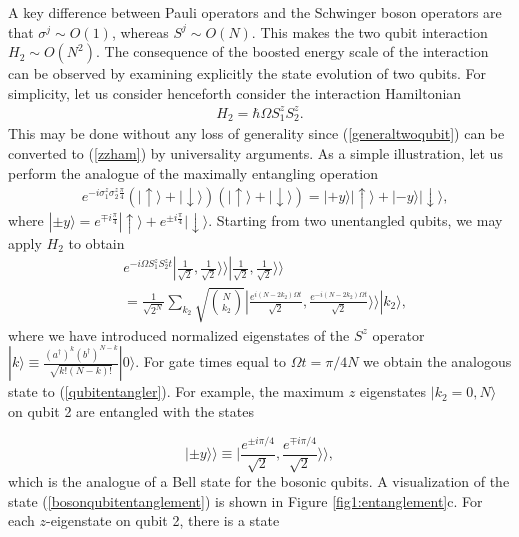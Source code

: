 \documentclass[
aps,%
12pt,%
final,%
notitlepage,%
oneside,%
onecolumn,%
nobibnotes,%
nofootinbib,%
superscriptaddress,%
noshowpacs,%
centertags]%
{revtex4}
\begin{document}
A key difference between Pauli operators and the Schwinger boson operators are that $ \sigma^j \sim O(1) $, whereas $ S^j \sim O(N) $.  This makes the two qubit interaction $ H_2 \sim O(N^2) $.  The consequence of the boosted energy scale of the interaction can be observed by examining explicitly the state evolution of two qubits. For simplicity, let us consider henceforth consider the interaction Hamiltonian 
%
\begin{align}
\label{zzham}
H_2 = \hbar \Omega S^z_1 S^z_2 .
\end{align}
%
This may be done without any loss of generality since (\ref{generaltwoqubit}) can be converted to (\ref{zzham}) by universality arguments. 
As a simple illustration, let us perform the analogue of the maximally entangling operation 
%
\begin{align}
& e^{-i  \sigma^z_1 \sigma^z_2 \frac{\pi}{4} } ( | \uparrow \rangle + | \downarrow \rangle ) ( | \uparrow \rangle + | \downarrow \rangle ) =  | + y \rangle | \uparrow \rangle  + | - y \rangle | \downarrow \rangle, \label{qubitentangler}
\end{align}
%
where $ | \pm y \rangle = e^{\mp i\frac{\pi}{4}} | \uparrow \rangle + e^{\pm i\frac{\pi}{4}} | \downarrow \rangle $. Starting from two unentangled qubits, we may apply $ H_2 $ to obtain
%
\begin{align}
& e^{-i \Omega S^z_1 S^z_2 t} | \frac{1}{\sqrt{2}}, \frac{1}{\sqrt{2}} \rangle \rangle | \frac{1}{\sqrt{2}}, \frac{1}{\sqrt{2}} \rangle \rangle \nonumber \\
& = \frac{1}{\sqrt{2^N}} \sum_{k_2} \sqrt{\binom{N}{k_2}}  | \frac{e^{i(N-2 k_2)\Omega t}}{\sqrt{2}}  , \frac{e^{-i(N-2 k_2) \Omega t}}{\sqrt{2}}  \rangle \rangle |k_2 \rangle ,
\label{bosonqubitentanglement}
\end{align}
%
where we have introduced normalized eigenstates of the $ S^z $ operator $ |k \rangle \equiv \frac{(a^\dagger)^k (b^\dagger)^{N-k}}{\sqrt{k!(N-k)!}} |0 \rangle $.  For gate times equal to $ \Omega t = \pi/4N   $ we obtain the analogous state to (\ref{qubitentangler}). For example, the maximum $z$ eigenstates $ |k_2=0,N \rangle $ on qubit 2 are entangled with the states  

\begin{equation}
| \pm y \rangle \rangle \equiv | \frac{e^{\pm i\pi/4}}{\sqrt{2}}  , \frac{e^{\mp i \pi/4}}{\sqrt{2}} \rangle \rangle  ,
\end{equation}
which is the analogue of a Bell state for the bosonic qubits. A visualization of the state (\ref{bosonqubitentanglement}) is shown in Figure \ref{fig1:entanglement}c. For each $z$-eigenstate on qubit 2, there is a state 
\end{document}
